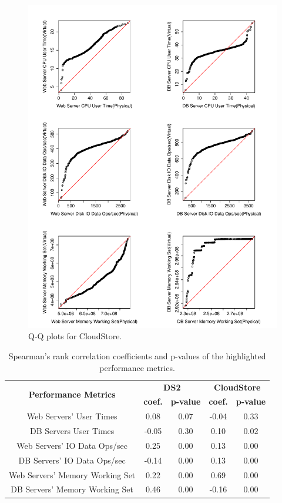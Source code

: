\begin{figure}[thb]
	\centering
	\includegraphics[width=0.9\columnwidth]{figures/cs_523_qq.pdf}
	\caption{Q-Q plots for CloudStore.}
	\label{fig:qqcs}
\end{figure}


\begin{table}[thb]
	\centering
	\caption{Spearman's rank correlation coefficients and p-values of the highlighted performance metrics.}
	\label{tab:correlationrq1}
		\begin{tabular}{|c||c|c|c|c|}
			\hline
			\multirow{2}{*}{\textbf{Performance Metrics}} & \multicolumn{2}{c|}{\textbf{DS2}} & \multicolumn{2}{c|}{\textbf{CloudStore}} \\ \cline{2-5} 
			& \textbf{coef.} & \textbf{p-value} & \textbf{coef.} & \textbf{p-value} \\ %
			\midrule 
			\midrule 
			Web Servers' User Times & 0.08 & 0.07 & -0.04 & 0.33 \\ \hline
			DB Servers User Times & -0.05 & 0.30 & 0.10 & 0.02 \\ \hline
			Web Servers' IO Data Ops/sec & 0.25 & 0.00 & 0.13 & 0.00 \\ \hline
			DB Servers' IO Data Ops/sec & -0.14 & 0.00 & 0.13 & 0.00 \\ \hline
			Web Servers' Memory Working Set & 0.22 & 0.00 & 0.69 & 0.00 \\ \hline
			DB Servers' Memory Working Set & 0.46 & 0.00 & -0.16 & 0.00 \\ \hline
		\end{tabular}
\end{table}

